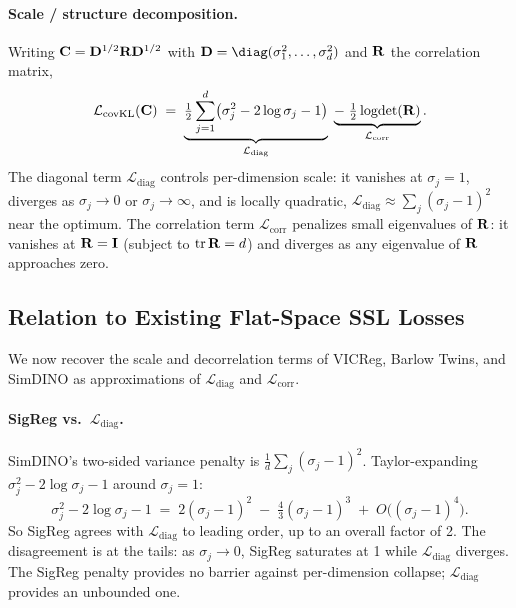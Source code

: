 \paragraph{Scale / structure decomposition.}
Writing $\mathbf{C} = \mathbf{D}^{1/2}\mathbf{R}\mathbf{D}^{1/2}$ with $\mat{D} = \diag(\sigma_1^2, \dots, \sigma_d^2)$ and $\mathbf{R}$ the correlation matrix,
\begin{equation}
\label{eq:decomp}
    \mathcal{L}_\text{covKL}(\mathbf{C}) \;=\; \underbrace{\tfrac{1}{2}\sum_{j=1}^{d}\bigl(\sigma_j^2 - 2\log\sigma_j - 1\bigr)}_{\mathcal{L}_\text{diag}} \;\underbrace{-\; \tfrac{1}{2}\operatorname{logdet}(\mathbf{R})}_{\mathcal{L}_\text{corr}}.
\end{equation}
The diagonal term $\mathcal{L}_\text{diag}$ controls per-dimension scale: it vanishes at $\sigma_j = 1$, diverges as $\sigma_j \to 0$ or $\sigma_j \to \infty$, and is locally quadratic, $\mathcal{L}_\text{diag} \approx \sum_j (\sigma_j - 1)^2$ near the optimum. The correlation term $\mathcal{L}_\text{corr}$ penalizes small eigenvalues of $\mathbf{R}$: it vanishes at $\mathbf{R} = \mathbf{I}$ (subject to $\operatorname{tr}\mathbf{R} = d$) and diverges as any eigenvalue of $\mathbf{R}$ approaches zero.

\subsection{Relation to Existing Flat-Space SSL Losses}
\label{sec:approximations}

We now recover the scale and decorrelation terms of VICReg, Barlow Twins, and SimDINO as approximations of $\mathcal{L}_\text{diag}$ and $\mathcal{L}_\text{corr}$.

\paragraph{SigReg vs.\ $\mathcal{L}_\text{diag}$.}
SimDINO's two-sided variance penalty \citep{schaeffer2024sigreg} is $\tfrac{1}{d}\sum_j (\sigma_j - 1)^2$. Taylor-expanding $\sigma_j^2 - 2\log\sigma_j - 1$ around $\sigma_j = 1$:
\begin{equation}
    \sigma_j^2 - 2\log\sigma_j - 1 \;=\; 2(\sigma_j - 1)^2 \;-\; \tfrac{4}{3}(\sigma_j - 1)^3 \;+\; O\!\bigl((\sigma_j - 1)^4\bigr).
\end{equation}
So SigReg agrees with $\mathcal{L}_\text{diag}$ to leading order, up to an overall factor of 2. The disagreement is at the tails: as $\sigma_j \to 0$, SigReg saturates at 1 while $\mathcal{L}_\text{diag}$ diverges. The SigReg penalty provides no barrier against per-dimension collapse; $\mathcal{L}_\text{diag}$ provides an unbounded one.

